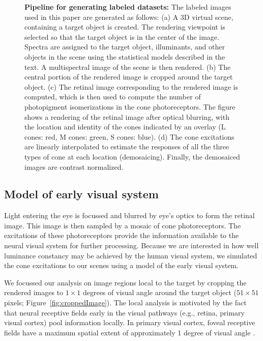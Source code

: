 \documentclass{jov}
\begin{document}
\begin{figure}
\begin{subfigure}[b]{0.205 \textwidth}
        \label{fig:coneContrast}
    \end{subfigure}
    \label{fig:sceneWithCroppedImage}
    \caption{{\bf Pipeline for generating labeled datasets:}  The labeled images used in this paper are generated as follows: (a) A 3D virtual scene, containing a target object is created. The rendering viewpoint is selected so that the target object is in the center of the image. Spectra are assigned to the target object, illuminants, and other objects in the scene using the statistical models described in the text. A multispectral image of the scene is then rendered. (b) The central portion of the rendered image is cropped around the target object. (c) The retinal image corresponding to the rendered image is computed, which is then used to compute the number of photopigment isomerizations in the cone photoreceptors. The figure shows a rendering of the retinal image after optical blurring, with the location and identity of the cones indicated by an overlay (L cones: red, M cones: green, S cones: blue).  (d) The cone excitations are linearly interpolated to estimate the responses of all the three types of cone at each location (demosaicing). Finally, the demosaiced images are contrast normalized.}
\end{figure}

\subsection{Model of early visual system} \label{method:Isetbio}
Light entering the eye is focussed and blurred by eye's optics to form the retinal image.
This image is then sampled by a mosaic of cone photoreceptors.
The excitations of these photoreceptors provide the information available to the neural visual system for further processing.
Because we are interested in how well luminance constancy may be achieved by the human visual system, we simulated the cone excitations
to our scenes using a model of the early visual system.

We focussed our analysis on image regions local to the target by cropping the rendered images to $1 \times 1$ degrees of visual angle around the target object ($51 \times 51$ pixels; Figure~\ref{fig:croppedImage}).
The local analysis is motivated by the fact that neural receptive fields early in the visual pathways (e.g., retina, primary visual cortex) pool information locally. 
In primary visual cortex, foveal receptive fields have a maximum spatial extent of approximately 1 degree of visual angle \cite{gattass1981visual, gattass1988visuotopic}. 
\end{document}
